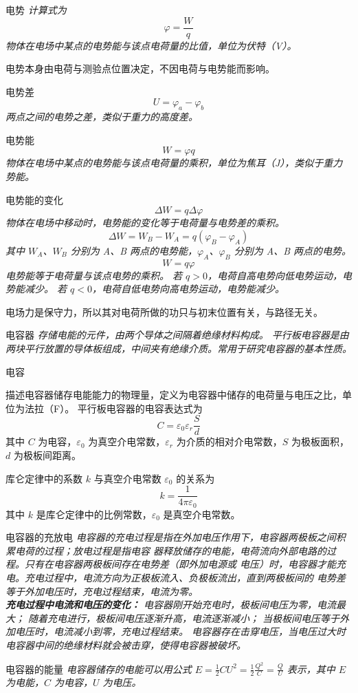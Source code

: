 \documentclass[a4paper, 12pt]{article}
\newcommand{\defitem}[2]{
  \noindent \textsf{#1} \hspace{1em} \itshape{#2} 
}
\newcommand{\noticebox}[1]{
  \begin{arcbox}
    \normalfont #1
  \end{arcbox}
}
\begin{document}
\defitem{电势}{
  计算式为
  \[\varphi = \frac W q\]
  物体在电场中某点的电势能与该点电荷量的比值，单位为伏特（V）。
}
\noticebox{
  电势本身由电荷与测验点位置决定，不因电荷与电势能而影响。
}
\defitem{电势差}{
  \[U=\varphi_a-\varphi_b\]
  两点之间的电势之差，类似于重力的高度差。\\
}
\defitem{电势能}{
  \[W=\varphi q\]
  物体在电场中某点的电势能与该点电荷量的乘积，单位为焦耳（J），类似于重力势能。\\
}
\defitem{电势能的变化}{
  \[
    \Delta W = q \Delta \varphi
  \]
  物体在电场中移动时，电势能的变化等于电荷量与电势差的乘积。
  \[
    \Delta W = W_B - W_A = q(\varphi_B - \varphi_A)
  \]
  其中 $W_A$、$W_B$ 分别为 A、B 两点的电势能，$\varphi_A$、$\varphi_B$ 分别为 A、B 两点的电势。
  \[
    W = q\varphi
  \]
  电势能等于电荷量与该点电势的乘积。
  若 $q>0$，电荷自高电势向低电势运动，电势能减少。
  若 $q<0$，电荷自低电势向高电势运动，电势能减少。
}
\noticebox{
  电场力是保守力，所以其对电荷所做的功只与初末位置有关，与路径无关。
}
\defitem{电容器}{
  存储电能的元件，由两个导体之间隔着绝缘材料构成。
  平行板电容器是由两块平行放置的导体板组成，中间夹有绝缘介质。常用于研究电容器的基本性质。\\
}
\defitem{电容}{
  描述电容器储存电能能力的物理量，定义为电容器中储存的电荷量与电压之比，单位为法拉（F）。
  平行板电容器的电容表达式为
  \[
    C = \varepsilon_0 \varepsilon_r \frac{S}{d}
  \]
  其中 $C$ 为电容，$\varepsilon_0$ 为真空介电常数，$\varepsilon_r$ 为介质的相对介电常数，$S$ 为极板面积，$d$ 为极板间距离。

  库仑定律中的系数 $k$ 与真空介电常数 $\varepsilon_0$ 的关系为
  \[
    k = \frac{1}{4\pi \varepsilon_0}
  \]
  其中 $k$ 是库仑定律中的比例常数，$\varepsilon_0$ 是真空介电常数。\\
}
\defitem{电容器的充放电}{
  电容器的充电过程是指在外加电压作用下，电容器两极板之间积累电荷的过程；放电过程是指电容
  器释放储存的电能，电荷流向外部电路的过程。只有在电容器两极板间存在电势差（即外加电源或
  电压）时，电容器才能充电。充电过程中，电流方向为正极板流入、负极板流出，直到两极板间的
  电势差等于外加电压时，充电过程结束，电流为零。\\
  \textbf{充电过程中电流和电压的变化：}
  电容器刚开始充电时，极板间电压为零，电流最大；
  随着充电进行，极板间电压逐渐升高，电流逐渐减小；
  当极板间电压等于外加电压时，电流减小到零，充电过程结束。
  电容器存在击穿电压，当电压过大时电容器中间的绝缘材料就会被击穿，使得电容器被破坏。\\
}
\defitem{电容器的能量}{
  电容器储存的电能可以用公式 $E = \frac{1}{2} C U^2=\frac12\frac {Q^2} C=\frac QU$ 
  表示，其中 $E$ 为电能，$C$ 为电容，$U$ 为电压。\\
}
\end{document}
